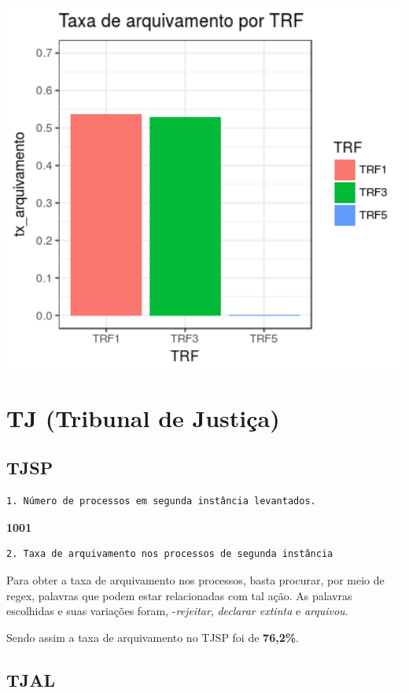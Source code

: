 \documentclass[12pt]{article}
\begin{document}
\includegraphics[width=5.57in]{plot_trf}

\section{TJ (Tribunal de Justiça)}\label{tj-tribunal-de-justica}

\subsection{TJSP}\label{tjsp}

\begin{verbatim}
1. Número de processos em segunda instância levantados.
\end{verbatim}

\textbf{1001}

\begin{verbatim}
2. Taxa de arquivamento nos processos de segunda instância
\end{verbatim}

Para obter a taxa de arquivamento nos processos, basta procurar, por
meio de regex, palavras que podem estar relacionadas com tal ação. As
palavras escolhidas e suas variações foram, -\emph{rejeitar},
\emph{declarar extinta} e \emph{arquivou}.

Sendo assim a taxa de arquivamento no TJSP foi de \textbf{76,2\%}.

\subsection{TJAL}\label{tjal}
\end{document}
